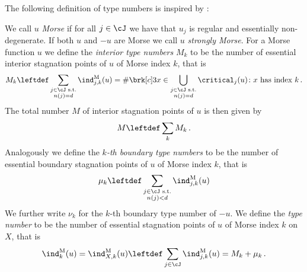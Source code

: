 The following definition of type numbers is inspired by \cite[Definition 10.3]{Morse1969}:
\begin{definition}
  We call $u$ \emph{Morse} if for all $j\in\cJ$ we have that $u_j$ is regular and essentially non-degenerate.
  If both $u$ and $-u$ are Morse we call $u$ \emph{strongly Morse}.
  For a Morse function $u$ we define 
  the \emph{interior type numbers} $M_k$ to be the number of essential interior stagnation points of $u$ of Morse index $k$, that is
  \begin{align}
    M_k\leftdef\sum_{\substack{j\in\cJ\text{ s.t.} \\ n(j)=d}}\ind^\text{M}_{j,k}(u)
    =\#\brk[c]3{x\in\bigcup_{\substack{j\in\cJ\text{ s.t.} \\ n(j)=d}}\critical_j(u)\colon x\text{ has index }k}\,.
    \label{eq:def_typenbr_interior}
  \end{align}
  The total number $M$ of interior
  stagnation points of $u$ is then given by
  \begin{align}
    M\leftdef\sum_kM_k\,.\label{eq:def_stagnationPtNbr}
  \end{align}
  Analogously we define the \emph{$k$-th boundary type numbers} to be the number of essential boundary 
  stagnation points of $u$ of Morse index $k$, that is
  \begin{align}
    \mu_k\leftdef\sum_{\substack{j\in\cJ\text{ s.t.}\\ n(j)<d}}\ind^\text{M}_{j,k}(u)\label{eq:bdTypeNbrs}
  \end{align}
  We further write $\nu_k$ for the $k$-th boundary type number of $-u$.
  We define the \emph{type number} to be the number of
  essential stagnation points of $u$ of Morse index $k$ on $X$, that is
  \begin{align}
    \ind^\text{M}_k(u)=\ind^\text{M}_{X,k}(u)\leftdef\sum_{j\in\cJ}\ind^\text{M}_{j,k}(u)=M_k+\mu_k\,.\label{eq:def_typenbr_total}
  \end{align}
\end{definition}

